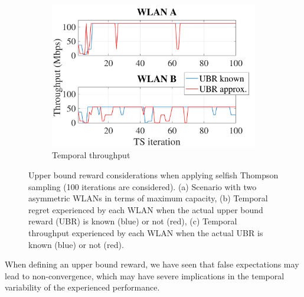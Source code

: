\documentclass{article}
\begin{document}
\begin{figure}[h!]
	\begin{subfigure}[b]{0.3\textwidth}
		\includegraphics[width=\textwidth]{approx_vs_actual_tpt}
		\caption{Temporal throughput}
		\label{fig:approx_vs_actual_tpt}
	\end{subfigure}
	\caption{Upper bound reward considerations when applying selfish Thompson sampling (100 iterations are considered). (a) Scenario with two asymmetric WLANs in terms of maximum capacity, (b) Temporal regret experienced by each WLAN when the actual upper bound reward (UBR) is known (blue) or not (red), (c) Temporal throughput experienced by each WLAN when the actual UBR is known (blue) or not (red).}	
	\label{fig:actual_vs_approximated_reward}
\end{figure} 

When defining an upper bound reward, we have seen that false expectations may lead to non-convergence, which may have severe implications in the temporal variability of the experienced performance.

\end{document}

